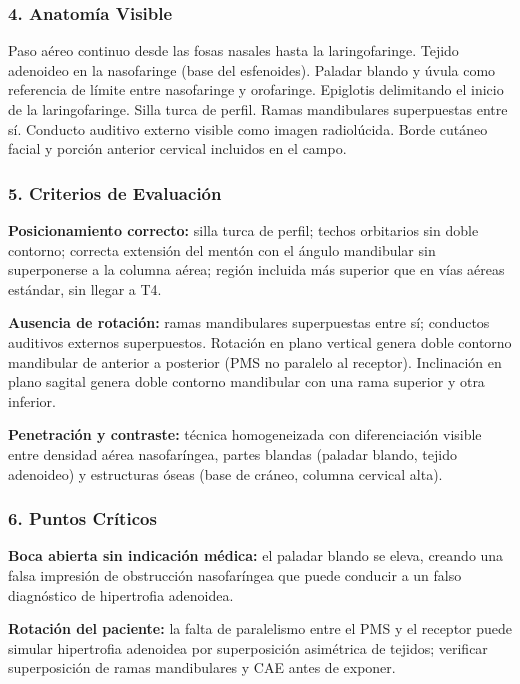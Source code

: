 \subsubsection*{4. Anatomía Visible}

Paso aéreo continuo desde las fosas nasales hasta la laringofaringe. Tejido adenoideo en la nasofaringe (base del esfenoides). Paladar blando y úvula como referencia de límite entre nasofaringe y orofaringe. Epiglotis delimitando el inicio de la laringofaringe. Silla turca de perfil. Ramas mandibulares superpuestas entre sí. Conducto auditivo externo visible como imagen radiolúcida. Borde cutáneo facial y porción anterior cervical incluidos en el campo.

\subsubsection*{5. Criterios de Evaluación}

\textbf{Posicionamiento correcto:} silla turca de perfil; techos orbitarios sin doble contorno; correcta extensión del mentón con el ángulo mandibular sin superponerse a la columna aérea; región incluida más superior que en vías aéreas estándar, sin llegar a T4.

\textbf{Ausencia de rotación:} ramas mandibulares superpuestas entre sí; conductos auditivos externos superpuestos. Rotación en plano vertical genera doble contorno mandibular de anterior a posterior (PMS no paralelo al receptor). Inclinación en plano sagital genera doble contorno mandibular con una rama superior y otra inferior.

\textbf{Penetración y contraste:} técnica homogeneizada con diferenciación visible entre densidad aérea nasofaríngea, partes blandas (paladar blando, tejido adenoideo) y estructuras óseas (base de cráneo, columna cervical alta).

\subsubsection*{6. Puntos Críticos}

\textbf{Boca abierta sin indicación médica:} el paladar blando se eleva, creando una falsa impresión de obstrucción nasofaríngea que puede conducir a un falso diagnóstico de hipertrofia adenoidea.

\textbf{Rotación del paciente:} la falta de paralelismo entre el PMS y el receptor puede simular hipertrofia adenoidea por superposición asimétrica de tejidos; verificar superposición de ramas mandibulares y CAE antes de exponer.

